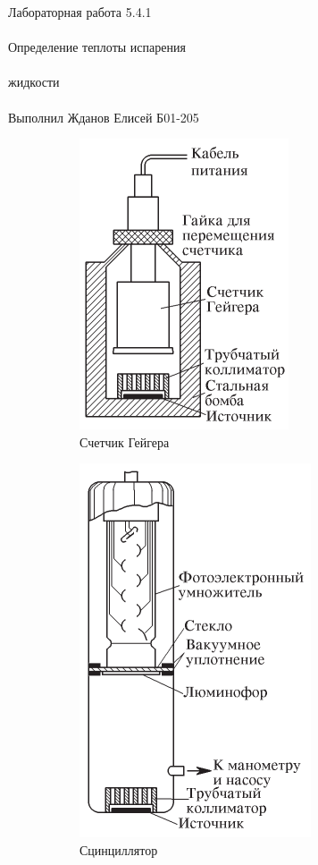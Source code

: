 \documentclass{astroedu-lab}
\begin{document}
\begin{problem}{\huge Лабораторная работа 5.4.1\\\\Определение теплоты испарения\\\\жидкости\\\\Выполнил Жданов Елисей Б01-205}
		
\begin{figure}[h!]
    \centering
    \begin{subfigure}{0.3\textwidth}
        \includegraphics[scale=1]{ustanovka1.pdf}
        \caption{Счетчик Гейгера}
        \label{pic1}
    \end{subfigure}
    \begin{subfigure}{0.3\textwidth}
        \includegraphics[scale=0.8]{ustanovka2.pdf}
        \caption{Сцинциллятор}
        \label{pic2}
    \end{subfigure}
    \begin{subfigure}{0.3\textwidth}

\end{subfigure}
\end{figure}
\end{problem}
\end{document}
